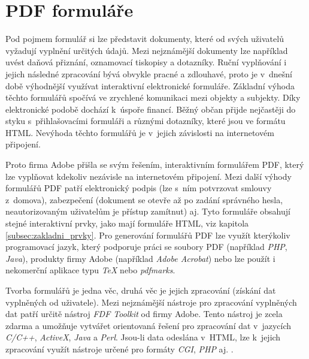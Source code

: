 \section{PDF formuláře}
Pod pojmem formulář si lze představit dokumenty, které od svých uživatelů vyžadují vyplnění určitých údajů. Mezi nejznámější dokumenty lze například uvést daňová přiznání, oznamovací tiskopisy a dotazníky. Ruční vyplňování i jejich následné zpracování bývá obvykle pracné a zdlouhavé, proto je v~dnešní době výhodnější využívat interaktivní elektronické formuláře. Základní výhoda těchto formulářů spočívá ve zrychlené komunikaci mezi objekty a subjekty. Díky elektronické podobě dochází k~úspoře financí. Běžný občan přijde nejčastěji do styku s~přihlašovacími formuláři a různými dotazníky, které jsou ve formátu HTML. Nevýhoda těchto formulářů je v~jejich závislosti na internetovém připojení. 
\par
Proto firma Adobe přišla se svým řešením, interaktivním formulářem PDF, který lze vyplňovat kdekoliv nezávisle na internetovém připojení. Mezi další výhody formulářů PDF patří elektronický podpis (lze s~ním potvrzovat smlouvy z~domova), zabezpečení (dokument se otevře až po zadání správného hesla, neautorizovaným uživatelům je přístup zamítnut) aj. Tyto formuláře obsahují stejné interaktivní prvky, jako mají formuláře HTML, viz kapitola \ref{subsec:zakladni_prvky}. Pro generování formulářů PDF lze využít kterýkoliv programovací jazyk, který podporuje práci se soubory PDF (například \textit{PHP}, \textit{Java}), produkty firmy Adobe (například \textit{Adobe Acrobat}) nebo lze použít i nekomerční aplikace typu \textit{TeX} nebo \textit{pdfmarks}.
\par
Tvorba formulářů je jedna věc, druhá věc je jejich zpracování (získání dat vyplněných od uživatele). Mezi nejznámější nástroje pro zpracování vyplněných dat patří určitě nástroj \textit{FDF Toolkit} od firmy Adobe. Tento nástroj je zcela zdarma a umožňuje vytvářet orientovaná řešení pro zpracování dat v~jazycích \textit{C/C++}, \textit{ActiveX}, \textit{Java} a \textit{Perl}. Jsou-li data odeslána v~HTML, lze k~jejich zpracování využít nástroje určené pro formáty \textit{CGI}, \textit{PHP} aj. \cite{PDFForm}.
